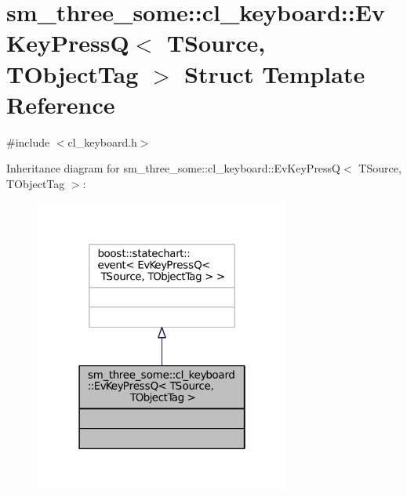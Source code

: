 \hypertarget{structsm__three__some_1_1cl__keyboard_1_1EvKeyPressQ}{}\section{sm\+\_\+three\+\_\+some\+:\+:cl\+\_\+keyboard\+:\+:Ev\+Key\+PressQ$<$ T\+Source, T\+Object\+Tag $>$ Struct Template Reference}
\label{structsm__three__some_1_1cl__keyboard_1_1EvKeyPressQ}


{\ttfamily \#include $<$cl\+\_\+keyboard.\+h$>$}



Inheritance diagram for sm\+\_\+three\+\_\+some\+:\+:cl\+\_\+keyboard\+:\+:Ev\+Key\+PressQ$<$ T\+Source, T\+Object\+Tag $>$\+:
\nopagebreak
\begin{figure}[H]
\begin{center}
\leavevmode
\includegraphics[width=238pt]{structsm__three__some_1_1cl__keyboard_1_1EvKeyPressQ__inherit__graph}
\end{center}
\end{figure}


